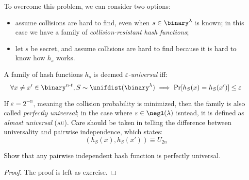 To overcome this problem, we can consider two options:
\begin{itemize}
    \item assume collisions are hard to find, even when $s \in \binary^{\lambda}$ is known; in this case we have a family of \textit{collision-resistant hash functions};
    \item let $s$ be secret, and assume collisions are hard to find because it is hard to know how $h_s$ works.
\end{itemize}

\begin{definition}
    A family of hash functions $h_s$ is deemed \emph{$\varepsilon$-universal} iff:
    \[
        \forall x \neq x' \in \binary^{n \cdot t}, S \sim \unifdist(\binary^\lambda) \implies \Pr[h_S(x) = h_S(x')] \leq \varepsilon  
    \]
\end{definition}

If $\varepsilon = 2^{-n}$, meaning the collision probability is minimized, then the family is also called \emph{perfectly universal}; in the case where $\varepsilon \in \negl(\lambda)$ isntead, it is defined as \emph{almost universal} (\textsc{au}). Care should be taken in telling the difference between universality and pairwise independence, which states:
\[
    (h_S(x), h_S(x')) \equiv U_{2n}
\]

\begin{lemma}
    Show that any pairwise independent hash function is perfectly universal.
\end{lemma}

\begin{proof} The proof is left as exercise.
\end{proof}

